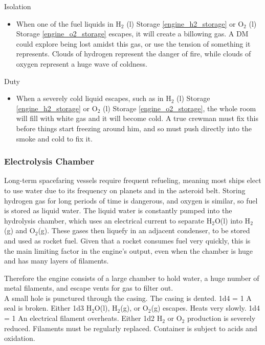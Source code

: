 \documentclass[a4paper]{article}
\begin{document}
\begin{minipage}[t]{0.4\linewidth}
Isolation
\begin{itemize}
\item When one of the fuel liquids in H$_2$ (l) Storage \ref{engine_h2_storage} or O$_2$ (l) Storage \ref{engine_o2_storage} escapes, it will create a billowing gas. A DM could explore being lost amidst this gas, or use the tension of something it represents. Clouds of hydrogen represent the danger of fire, while clouds of oxygen represent a huge wave of coldness. 
\end{itemize}
\end{minipage}
\begin{minipage}[t]{0.4\linewidth}
Duty
\begin{itemize}
\item When a severely cold liquid escapes, such as in H$_2$ (l) Storage \ref{engine_h2_storage} or O$_2$ (l) Storage \ref{engine_o2_storage}, the whole room will fill with white gas and it will become cold. A true crewman must fix this before things start freezing around him, and so must push directly into the smoke and cold to fix it.
\end{itemize}
\end{minipage}


\hspace{-18pt} \subsubsection{Electrolysis Chamber} \label{engine_electrolysis} \vspace{-0.2cm}
Long-term spacefaring vessels require frequent refueling, meaning most ships elect to use water due to its frequency on planets and in the asteroid belt. Storing hydrogen gas for long periods of time is dangerous, and oxygen is similar, so fuel is stored as liquid water. The liquid water is constantly pumped into the hydrolysis chamber, which uses an electrical current to separate H$_2$O(l) into H$_2$(g) and O$_2$(g). These gases then liquefy in an adjacent condenser, to be stored and used as rocket fuel. Given that a rocket consumes fuel very quickly, this is the main limiting factor in the engine's output, even when the chamber is huge and has many layers of filaments. 

Therefore the engine consists of a large chamber to hold water, a huge number of metal filaments, and escape vents for gas to filter out.
\\ \pbhw
{A small hole is punctured through the casing. \newline {}}
{The casing is dented. \newline 1d4 = 1 A seal is broken. Either 1d3 H$_2$O(l), H$_2$(g), or O$_2$(g) escapes.}
{Heats very slowly. \newline 1d4 = 1 An electrical filament overheats. Either 1d2 H$_2$ or O$_2$ production is severely reduced.}
{Filaments must be regularly replaced. Container is subject to acids and oxidation.}
\end{document}
